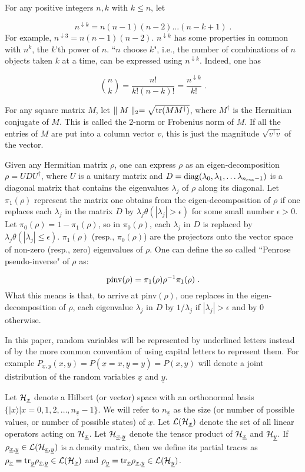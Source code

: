 \documentclass[12pt]{article}%
\newcommand{\ket}[1]{|#1\rangle}
\newcommand{\tr}[0]{{\rm tr }}
\newcommand{\beq}{\begin{equation}}
\newcommand{\eeq}{\end{equation}}
\newcommand{\ul}[1]{\underline{#1}}
\newcommand{\rvx}[0]{{\ul{x}}}
\newcommand{\rvy}[0]{{\ul{y}}}
\newcommand{\diag}[0]{{\rm diag}}
\newcommand{\calh}[0]{{\cal H}}
\newcommand{\call}[0]{{\cal L}}
\newcommand{\lam}[0]{\lambda}
\newcommand{\nev}[0]{{n_{\rm eva}}}
\newcommand{\norm}[1]{\parallel #1 \parallel_2}
\newcommand{\darrow}[0]{{\downarrow}}
\begin{document}
For any positive integers $n,k$ with $k\leq n$, let

\beq
n^{\darrow k} = n(n-1)(n-2)\ldots (n-k+1)
\;.
\eeq
For example, $n^{\darrow 3} = n(n-1)(n-2)$.
$n^{\darrow k}$
has some properties in common with $n^k$,
the $k$'th power of $n$. ``$n$ choose $k$",
i.e.,
the number of combinations of $n$
objects taken $k$ at
a time, can be expressed using $n^{\darrow k}$.
Indeed, one has


\beq
{n\choose k} = \frac{n!}{k!(n-k)!}
 = \frac{n^{\darrow k}}{k!}
\;.
\eeq

For any square matrix $M$,  let
$\norm{M} = \sqrt{\tr(MM^\dag)}$,
where $M^\dag$ is the Hermitian
conjugate of $M$. This is called the 2-norm
or Frobenius norm of $M$. If all the entries of $M$ are
put into a column vector $v$, this is just the magnitude
$\sqrt{v^\dag v}$ of the vector.

Given any Hermitian matrix $\rho$, one can express $\rho$ as
an eigen-decomposition
$\rho=UDU^\dag$, where $U$ is a unitary
matrix and $D=\diag(
\lam_0, \lam_1, \ldots \lam_{\nev-1})$ is
a diagonal
matrix that contains the eigenvalues $\lam_j$  of $\rho$
along its diagonal. Let
$\pi_1(\rho)$ represent
the matrix one obtains
from the eigen-decomposition of $\rho$
 if one replaces
each $\lam_j$ in the matrix $D$
by $\lam_j\theta(|\lam_j|>\epsilon)$ for some small number
$\epsilon>0$. Let $\pi_0(\rho)=1-\pi_1(\rho)$,
so in $\pi_0(\rho)$, each $\lam_j$
in $D$ is replaced
by $\lam_j\theta(|\lam_j|\leq \epsilon)$.
$\pi_1(\rho)$ (resp., $\pi_0(\rho)$)
are the projectors onto the vector
space of non-zero (resp., zero)
eigenvalues of $\rho$. One can define the so called ``Penrose
pseudo-inverse" of $\rho$
 as:

\beq
{\rm pinv}(\rho)=
\pi_1(\rho)\rho^{-1} \pi_1(\rho)
\;.
\eeq
What this means is that, to arrive
at pinv$(\rho)$, one replaces
in the eigen-decomposition
of $\rho$, each
eigenvalue $\lam_j$ in $D$ by
$1/\lam_j$ if $|\lam_j|>\epsilon$
and by 0 otherwise.

In this paper, random variables will be
represented by underlined letters
 instead of by the more common
convention of using capital letters to represent them.
For example $P_{\rvx, \rvy}(x, y)=P(\rvx=x,\rvy=y)=P(x,y)$
will denote a joint distribution of the random variables
$\rvx$ and $\rvy$.

Let $\calh_\rvx$ denote a Hilbert (or vector) space
with an orthonormal basis $\{\ket{x}|x=0,1,2,\ldots, n_\rvx-1\}$.
We will refer to $n_\rvx$ as the size (or number of
possible values, or number of possible states) of $\rvx$.
Let $\call(\calh_\rvx)$ denote the set of all linear operators
acting on $\calh_\rvx$.
Let $\calh_{\rvx, \rvy}$ denote the tensor product of $\calh_\rvx$
and $\calh_\rvy$. If $\rho_{\rvx, \rvy}\in \call(\calh_{\rvx, \rvy})$
is a density matrix, then we define its partial traces as
$\rho_\rvx=\tr_\rvy\rho_{\rvx, \rvy}\in\call(\calh_{\rvx})$
and
$\rho_\rvy=\tr_\rvx\rho_{\rvx, \rvy}\in\call(\calh_{\rvy})$.
\end{document}
